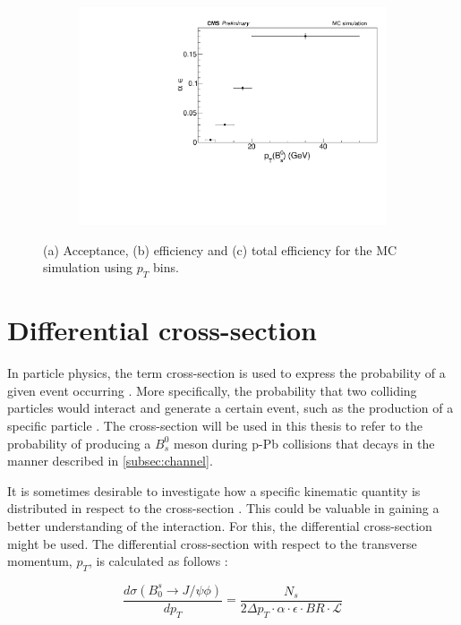 \begin{figure}[htp!]
\begin{subfigure}[b]{0.8\textwidth}
		\includegraphics[width=\textwidth]{MainContent/Figs/effy/totaleffy_ptbins.PDF}
		\caption{}%
	\end{subfigure}
	\caption{(a) Acceptance, (b) efficiency and (c) total efficiency for the MC simulation using $p_T$ bins.}
	\label{fig:effy_ptbins}
\end{figure}

\section{Differential cross-section}

In particle physics, the term cross-section is used to express the probability of a given event occurring \cite{thomson2013modern}. More specifically, the probability that two colliding particles would interact and generate a certain event, such as the production of a specific particle \cite{pivarski2013}. The cross-section will be used in this thesis to refer to the probability of producing a $B^0_s$ meson during p-Pb collisions that decays in the manner described in \ref{subsec:channel}.

It is sometimes desirable to investigate how a specific kinematic quantity is distributed in respect to the cross-section \cite{thomson2013modern}. This could be valuable in gaining a better understanding of the interaction. For this, the differential cross-section might be used. The differential cross-section with respect to the transverse momentum, $p_T$, is calculated as follows \cite{abe1995measurement}: 

\begin{equation}
	\label{eq:cs}
\frac{d \sigma(B_0^s \to J/\psi\phi)}{dp_T} = \frac{N_s}{2 \Delta p_T \cdot \alpha \cdot \epsilon \cdot BR \cdot \mathcal{L}}
\end{equation}

